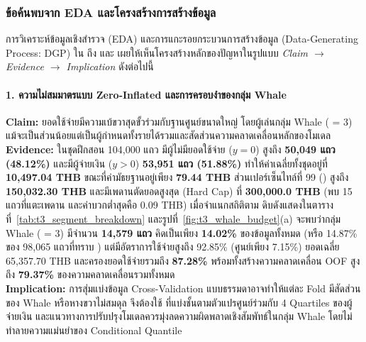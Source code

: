 \subsubsection{ข้อค้นพบจาก EDA และโครงสร้างการสร้างข้อมูล}
\label{subsubsec:t3_eda}

การวิเคราะห์ข้อมูลเชิงสำรวจ (EDA) และการแกะรอยกระบวนการสร้างข้อมูล (Data-Generating Process: DGP) ใน  ถึง  และ  เผยให้เห็นโครงสร้างหลักของปัญหาในรูปแบบ \textit{Claim $\rightarrow$ Evidence $\rightarrow$ Implication} ดังต่อไปนี้

\paragraph{1. ความไม่สมมาตรแบบ Zero-Inflated และการครอบงำของกลุ่ม Whale}
\textbf{Claim:} ยอดใช้จ่ายมีความเบ้ขวาสุดขั้วร่วมกับฐานศูนย์ขนาดใหญ่ โดยผู้เล่นกลุ่ม Whale ( = 3) แม้จะเป็นส่วนน้อยแต่เป็นผู้กำหนดทั้งรายได้รวมและสัดส่วนความคลาดเคลื่อนหลักของโมเดล \\
\textbf{Evidence:} ในชุดฝึกสอน 104,000 แถว มีผู้ไม่มียอดใช้จ่าย ($y = 0$) สูงถึง \textbf{50,049 แถว (48.12\%)} และมีผู้จ่ายเงิน ($y > 0$) \textbf{53,951 แถว (51.88\%)} ทำให้ค่าเฉลี่ยทั้งชุดอยู่ที่ \textbf{10,497.04 THB} ขณะที่ค่ามัธยฐานอยู่เพียง \textbf{79.44 THB} ส่วนเปอร์เซ็นไทล์ที่ 99 () สูงถึง \textbf{150,032.30 THB} และมีเพดานตัดยอดสูงสุด (Hard Cap) ที่ \textbf{300,000.0 THB} (พบ 15 แถวที่แตะเพดาน และค่าบวกต่ำสุดคือ 0.09 THB) เมื่อจำแนกสถิติตาม  ดิบดังแสดงในตารางที่~\ref{tab:t3_segment_breakdown} และรูปที่~\ref{fig:t3_whale_budget}(a) จะพบว่ากลุ่ม Whale ( = 3) มีจำนวน \textbf{14,579 แถว} คิดเป็นเพียง \textbf{14.02\%} ของข้อมูลทั้งหมด (หรือ 14.87\% ของ 98,065 แถวที่ทราบ ) แต่มีอัตราการใช้จ่ายสูงถึง 92.85\% (ศูนย์เพียง 7.15\%) ยอดเฉลี่ย 65,357.70 THB และครองยอดใช้จ่ายรวมถึง \textbf{87.28\%} พร้อมทั้งสร้างความคลาดเคลื่อน OOF สูงถึง \textbf{79.37\%} ของความคลาดเคลื่อนรวมทั้งหมด \\
\textbf{Implication:} การสุ่มแบ่งข้อมูล Cross-Validation แบบธรรมดาอาจทำให้แต่ละ Fold มีสัดส่วนของ Whale หรือหางขวาไม่สมดุล จึงต้องใช้  ที่แบ่งชั้นตามตัวแปรศูนย์ร่วมกับ 4 Quartiles ของผู้จ่ายเงิน และแนวทางการปรับปรุงโมเดลควรมุ่งลดความผิดพลาดเชิงสัมพัทธ์ในกลุ่ม Whale โดยไม่ทำลายความแม่นยำของ Conditional Quantile

